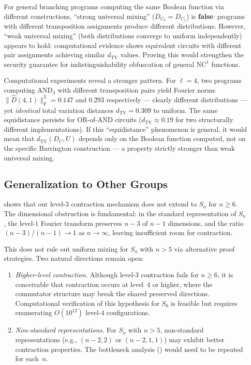 \documentclass[11pt]{article}
\newcommand{\norm}[1]{\lVert #1 \rVert}
\newcommand{\frob}[1]{\norm{#1}_{\mathrm{F}}}
\newcommand{\dtv}{d_{\mathrm{TV}}}
\newcommand{\Dhat}{\widehat{D}}
\begin{document}
For general branching programs computing the same Boolean function via
different constructions, ``strong universal mixing'' ($D_{C_0} = D_{C_1}$)
is \textbf{false}: programs with different transposition assignments produce
different distributions. However, ``weak universal mixing'' (both distributions
converge to uniform independently) appears to hold: computational evidence shows
equivalent circuits with different pair assignments achieving similar $\dtv$
values. Proving this would strengthen the security guarantee for
indistinguishability obfuscation of general $\mathrm{NC}^1$ functions.

Computational experiments reveal a stronger pattern.  For $\ell = 4$, two
programs computing $\mathrm{AND}_4$ with different transposition pairs
yield Fourier norms $\frob{\Dhat(4,1)}^2 = 0.147$ and $0.293$
respectively --- clearly different distributions --- yet \emph{identical}
total variation distances $\dtv = 0.309$ to uniform.  The same equidistance
persists for OR-of-AND circuits ($\dtv \approx 0.19$ for two structurally
different implementations).  If this ``equidistance'' phenomenon is general,
it would mean that $\dtv(D_C, U)$ depends only on the Boolean function
computed, not on the specific Barrington construction --- a property
strictly stronger than weak universal mixing.


\subsection{Generalization to Other Groups}

 shows that our level-$3$ contraction mechanism
does not extend to $S_n$ for $n \geq 6$. The dimensional obstruction is
fundamental: in the standard representation of $S_n$, the level-$1$
Fourier transform preserves $n-3$ of $n-1$ dimensions, and the ratio
$(n-3)/(n-1) \to 1$ as $n \to \infty$, leaving insufficient room for
contraction.

This does not rule out uniform mixing for $S_n$ with $n > 5$ via
alternative proof strategies. Two natural directions remain open:
\begin{enumerate}[nosep]
\item \emph{Higher-level contraction.} Although level-$3$ contraction
  fails for $n \geq 6$, it is conceivable that contraction occurs at
  level~$4$ or higher, where the commutator structure may break the
  shared preserved directions. Computational verification of this
  hypothesis for $S_6$ is feasible but requires enumerating
  $O(10^{12})$ level-$4$ configurations.
\item \emph{Non-standard representations.} For $S_n$ with $n > 5$,
  non-standard representations (e.g., $(n-2,2)$ or $(n-2,1,1)$) may
  exhibit better contraction properties. The bottleneck analysis
  () would need to be repeated for each~$n$.
\end{enumerate}
\end{document}
